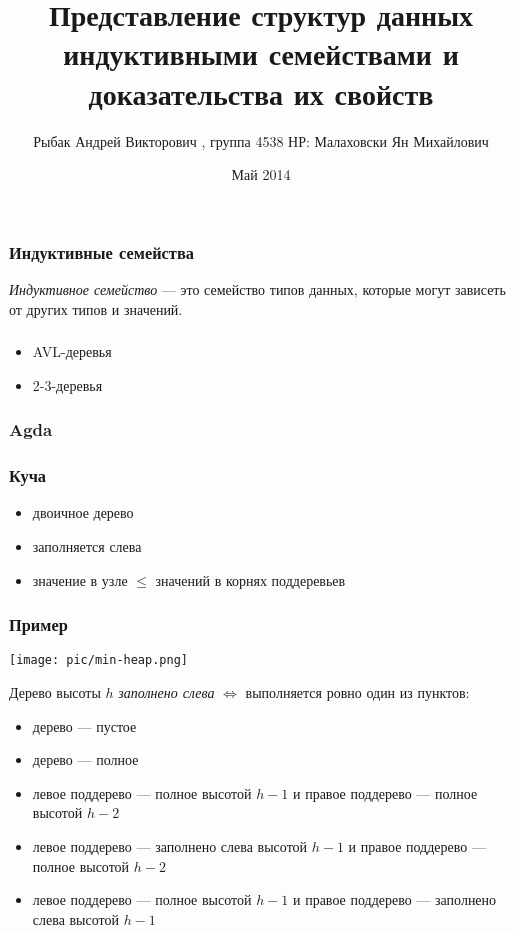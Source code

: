 \documentclass{beamer}
\title[Представление структур данных индуктивными семействами и доказательства их свойств]{Представление структур данных индуктивными семействами и доказательства их свойств}
\institute{НИУ ИТМО}
\author[Рыбак А.В.]{Рыбак Андрей Викторович , группа 4538
\newline НР: Малаховски Ян Михайлович}
\date{
Май 2014
}
\begin{document}
\maketitle

\begin{frame}
    \frametitle{Индуктивные семейства}
        \emph{Индуктивное семейство} — это семейство типов данных,
        которые могут зависеть от других типов и значений.
\end{frame}

\begin{frame}
    \frametitle{}
    \begin{itemize}
        \item AVL-деревья
        \item 2-3-деревья
    \end{itemize}
\end{frame}

\begin{frame}
    \frametitle{Agda}
    
\end{frame}

\begin{frame}
    \frametitle{Куча}
    \begin{itemize}
        \item двоичное дерево
        \item заполняется слева
        \item значение в узле $ \leq $ значений в корнях поддеревьев
    \end{itemize}
\end{frame}
\begin{frame}
    \frametitle{Пример}
    \texttt{[image: pic/min-heap.png]}
\end{frame}
\begin{frame}
Дерево высоты $h$ \emph{заполнено слева} $ \iff $
выполняется ровно один из пунктов:
  \begin{itemize}
    \item дерево — пустое
    \item дерево — полное
    \item левое поддерево — полное высотой $h-1$ и правое поддерево — полное высотой $h-2$
    \item левое поддерево — заполнено слева высотой $h-1$ и правое поддерево — полное высотой $h-2$
    \item левое поддерево — полное высотой $h-1$ и правое поддерево — заполнено слева высотой $h-1$
  \end{itemize}

\end{frame}
\begin{frame}
    
\end{frame}
\end{document}
